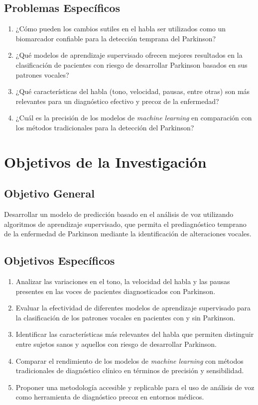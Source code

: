 \documentclass[a4paper,12pt]{article}
\begin{document}
\subsection{Problemas Específicos}
\begin{enumerate}
    \item ¿Cómo pueden los cambios sutiles en el habla ser utilizados como un biomarcador confiable para la detección temprana del Parkinson?
    \item ¿Qué modelos de aprendizaje supervisado ofrecen mejores resultados en la clasificación de pacientes con riesgo de desarrollar Parkinson basados en sus patrones vocales?
    \item ¿Qué características del habla (tono, velocidad, pausas, entre otras) son más relevantes para un diagnóstico efectivo y precoz de la enfermedad?
    \item ¿Cuál es la precisión de los modelos de \textit{machine learning} en comparación con los métodos tradicionales para la detección del Parkinson?
\end{enumerate}

\section{Objetivos de la Investigación}

\subsection{Objetivo General}
Desarrollar un modelo de predicción basado en el análisis de voz utilizando algoritmos de aprendizaje supervisado, que permita el prediagnóstico temprano de la enfermedad de Parkinson mediante la identificación de alteraciones vocales.

\subsection{Objetivos Específicos}
\begin{enumerate}
    \item Analizar las variaciones en el tono, la velocidad del habla y las pausas presentes en las voces de pacientes diagnosticados con Parkinson.
    \item Evaluar la efectividad de diferentes modelos de aprendizaje supervisado para la clasificación de los patrones vocales en pacientes con y sin Parkinson.
    \item Identificar las características más relevantes del habla que permiten distinguir entre sujetos sanos y aquellos con riesgo de desarrollar Parkinson.
    \item Comparar el rendimiento de los modelos de \textit{machine learning} con métodos tradicionales de diagnóstico clínico en términos de precisión y sensibilidad.
    \item Proponer una metodología accesible y replicable para el uso de análisis de voz como herramienta de diagnóstico precoz en entornos médicos.
\end{enumerate}
\end{document}
